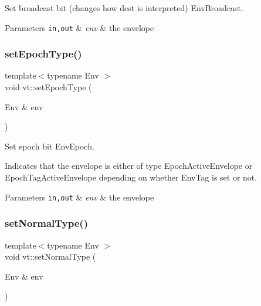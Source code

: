 Set broadcast bit (changes how {\ttfamily dest} is interpreted) {\ttfamily Env\+Broadcast}. 


\begin{DoxyParams}[1]{Parameters}
\mbox{\tt in,out}  & {\em env} & the envelope \\
\hline
\end{DoxyParams}
\mbox{\label{namespacevt_afb12c8cb2f8d47e2f06ffa25574f0dd0}} 
\subsubsection{\texorpdfstring{set\+Epoch\+Type()}{setEpochType()}}
{\footnotesize\ttfamily template$<$typename Env $>$ \\
void vt\+::set\+Epoch\+Type (\begin{DoxyParamCaption}\item[{Env \&}]{env }\end{DoxyParamCaption})\hspace{0.3cm}{\ttfamily [inline]}}



Set epoch bit {\ttfamily Env\+Epoch}. 

Indicates that the envelope is either of type {\ttfamily Epoch\+Active\+Envelope} or {\ttfamily Epoch\+Tag\+Active\+Envelope} depending on whether {\ttfamily Env\+Tag} is set or not.


\begin{DoxyParams}[1]{Parameters}
\mbox{\tt in,out}  & {\em env} & the envelope \\
\hline
\end{DoxyParams}
\mbox{\label{namespacevt_aa76e59d48d53aa1e4c60bd55ff520d6a}} 
\subsubsection{\texorpdfstring{set\+Normal\+Type()}{setNormalType()}}
{\footnotesize\ttfamily template$<$typename Env $>$ \\
void vt\+::set\+Normal\+Type (\begin{DoxyParamCaption}\item[{Env \&}]{env }\end{DoxyParamCaption})\hspace{0.3cm}{\ttfamily [inline]}}



